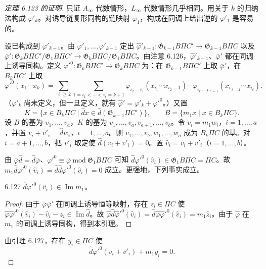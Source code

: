 \begin{proof}[定理 6.123 的证明]
  只证 $A_{\infty}$ 代数情形，$L_{\infty}$ 代数情形几乎相同。用关于 $k$ 的归纳法构成 $\varphi'_k$。对诱导链复形同构的链映射 $\varphi_1$，构成在同调上给出逆的 $\varphi'_1$ 是容易的。

  设已构成到 $\varphi'_{k-1}$。由 $\varphi'_1,\dots,\varphi'_{k-1}$ 定出 $\hat\varphi'_{k-1}\colon\mathfrak{G}_{k-1}B\Pi C'\to\mathfrak{G}_{k-1}B\Pi C$ 以及 $\bar\varphi'\colon\mathfrak{G}_kB\Pi C'/\mathfrak{G}_1B\Pi C'\to\mathfrak{G}_kB\Pi C/\mathfrak{G}_1B\Pi C$。由注意 6.126，$\hat\varphi'_{k-1}$、$\bar\varphi'$ 都在同调上诱导同构。定义 $\varphi'^0\colon\mathfrak{G}_kB\Pi C'\to\mathfrak{G}_kB\Pi C$ 为：在 $\mathfrak{G}_{k-1}B\Pi C'$ 上取 $\bar\varphi'$，在 $B_k\Pi C'$ 上取
  \[
    \varphi'^0(x_1\cdots x_k)=\sum_{\ell\ge2}\sum_{1=i_1<\cdots<i_\ell=k+1}
    \varphi_{i_2-i_1}(x_{i_1}\cdots x_{i_2-1})\cdots\varphi_{i_\ell-i_{\ell-1}}(x_{i_{\ell-1}}\cdots x_{i_\ell}).
  \]
  （$\varphi'_k$ 尚未定义，但一旦定义，就有 $\hat\varphi'=\varphi'_k+\varphi'^0$。）又置
  \[
    K=\{x\in B_k\Pi C\mid\hat dx\in\hat d(\mathfrak{G}_{k-1}\Pi C')\},\qquad
    B=\{m_1x\mid x\in B_k\Pi C\}.
  \]
  设 $B$ 的基为 $v_1,\dots,v_a$，$K$ 的基为 $v_1,\dots,v_a,v_{a+1},\dots,v_b$。令 $v_i=m_1w_i$，$i=1,\dots,a$，并置 $v_i+v'_i=\hat dw_i$，$i=1,\dots,a$。则 $v_1,\dots,v_b,w_1,\dots,w_a$ 成为 $B_k\Pi C$ 的基。对 $i=a+1,\dots,b$，把 $v'_i$ 取定使 $\hat d(v_i+v'_i)=0$。置 $\hat v_i=v_i+v'_i$（$i=1,\dots,b$）。

  由 $\bar\varphi\hat d=\hat d\bar\varphi$、$\varphi'^0\equiv\bar\varphi\ \mathrm{mod}\ \mathfrak{G}_1B\Pi C$ 可知 $\hat d\varphi'^0(\hat v_i)\in\mathfrak{G}_1B\Pi C=\Pi C$。故 $m_1\hat d\varphi'^0(\hat v_i)=\hat d\hat d\varphi'^0(\hat v_i)=0$ 成立。更强地，下列事实成立。

  \begin{lemma*}{6.127}
    $\hat d\varphi'^0(\hat v_i)\in\operatorname{Im}m_1$。
  \end{lemma*}

  \begin{proof}
    由于 $\bar\varphi\bar\varphi'$ 在同调上诱导恒等映射，存在 $z_i\in\Pi C$ 使 $\hat\varphi\hat\varphi'^0(\hat v_i)-\hat v_i-z_i\in\operatorname{Im}\hat d$。故 $\hat\varphi\hat d\hat\varphi'^0(\hat v_i)=\hat d\hat\varphi\hat\varphi'^0(\hat v_i)=m_1\hat z_i$。由于 $\hat\varphi$ 在 $m_1$ 的同调上诱导同构，得到本引理。
  \end{proof}

  由引理 6.127，存在 $y_i\in\Pi C$ 使
  \begin{equation}
    \hat d\varphi'^0(v_i+v'_i)+m_1y_i=0. \tag{6.52}
  \end{equation}


\end{proof}
